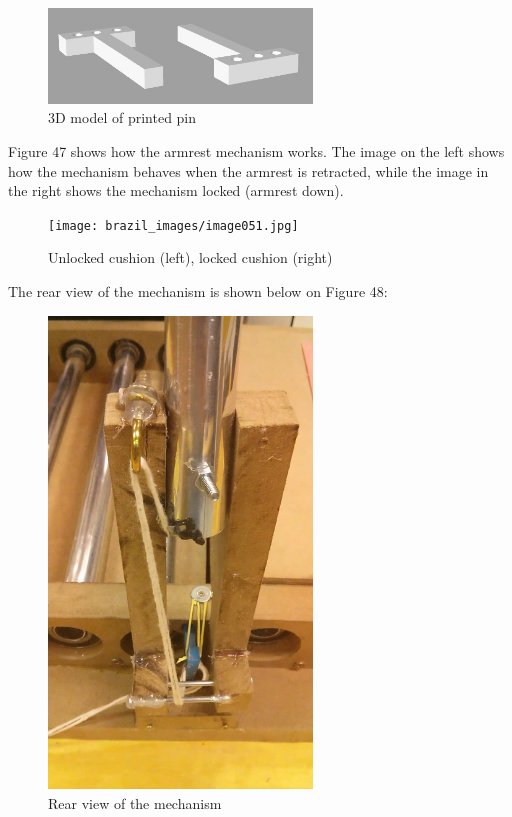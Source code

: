 \begin{figure}[h]
\centering
\includegraphics[width=7cm]{brazil_images/image050.png}
\caption{3D model of printed pin}
\label{fig:model_printed_pin}
\end{figure}

Figure 47 shows how the armrest mechanism works. The image on the left shows how the mechanism behaves when the armrest is retracted, while the image in the right shows the mechanism locked (armrest down).

\begin{figure}[h]
\centering
\texttt{[image: brazil\_images/image051.jpg]}
\caption{Unlocked cushion (left), locked cushion (right)}
\label{fig:cushion}
\end{figure}

The rear view of the mechanism is shown below on Figure 48: \\

\begin{figure}[h]
\centering
\includegraphics[width=7cm]{brazil_images/image053.png}
\caption{Rear view of the mechanism}
\label{fig:rear_view}
\end{figure}

